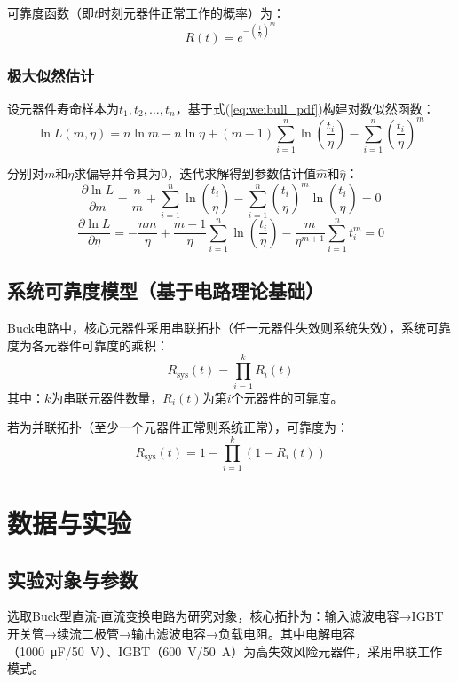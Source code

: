 \documentclass[12pt]{article}
\begin{document}
可靠度函数（即$t$时刻元器件正常工作的概率）为：
\begin{equation}\label{eq:weibull_r}
R(t) = e^{-\left( \frac{t}{\eta} \right)^m}
\end{equation}

\subsubsection{极大似然估计}
设元器件寿命样本为$t_1, t_2, \dots, t_n$，基于式(\ref{eq:weibull_pdf})构建对数似然函数：
\begin{equation}\label{eq:mle}
\ln L(m, \eta) = n\ln m - n\ln \eta + (m-1)\sum_{i=1}^n \ln\left( \frac{t_i}{\eta} \right) - \sum_{i=1}^n \left( \frac{t_i}{\eta} \right)^m
\end{equation}

分别对$m$和$\eta$求偏导并令其为0，迭代求解得到参数估计值$\hat{m}$和$\hat{\eta}$：
\[
\frac{\partial \ln L}{\partial m} = \frac{n}{m} + \sum_{i=1}^n \ln\left( \frac{t_i}{\eta} \right) - \sum_{i=1}^n \left( \frac{t_i}{\eta} \right)^m \ln\left( \frac{t_i}{\eta} \right) = 0
\]
\[
\frac{\partial \ln L}{\partial \eta} = -\frac{nm}{\eta} + \frac{m-1}{\eta}\sum_{i=1}^n \ln\left( \frac{t_i}{\eta} \right) - \frac{m}{\eta^{m+1}}\sum_{i=1}^n t_i^m = 0
\]

\subsection{系统可靠度模型（基于电路理论基础）}
Buck电路中，核心元器件采用串联拓扑（任一元器件失效则系统失效），系统可靠度为各元器件可靠度的乘积：
\begin{equation}\label{eq:series_r}
R_{\text{sys}}(t) = \prod_{i=1}^k R_i(t)
\end{equation}
其中：$k$为串联元器件数量，$R_i(t)$为第$i$个元器件的可靠度。

若为并联拓扑（至少一个元器件正常则系统正常），可靠度为：
\begin{equation}\label{eq:parallel_r}
R_{\text{sys}}(t) = 1 - \prod_{i=1}^k \left( 1 - R_i(t) \right)
\end{equation}

\section{数据与实验}
\subsection{实验对象与参数}
选取Buck型直流-直流变换电路为研究对象，核心拓扑为：输入滤波电容→IGBT开关管→续流二极管→输出滤波电容→负载电阻。其中电解电容（\SI{1000}{\micro\farad}/\SI{50}{\volt}）、IGBT（\SI{600}{\volt}/\SI{50}{\ampere}）为高失效风险元器件，采用串联工作模式。
\end{document}
